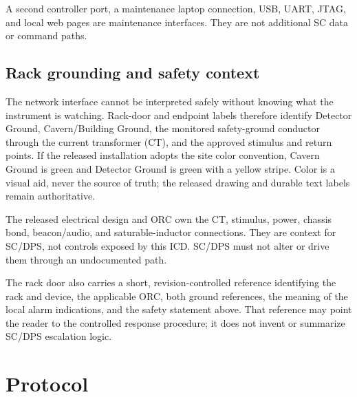 \documentclass{cernatlasnote}
\begin{document}
A second controller port, a maintenance laptop connection, USB, UART, JTAG,
and local web pages are maintenance interfaces. They are not additional SC
data or command paths.

\subsection{Rack grounding and safety context}

The network interface cannot be interpreted safely without knowing what the
instrument is watching. Rack-door and endpoint labels therefore identify
Detector Ground, Cavern/Building Ground, the monitored safety-ground conductor
through the current transformer (CT), and the approved stimulus and return
points. If the released installation adopts the site color convention, Cavern
Ground is green and Detector Ground is green with a yellow stripe. Color is a
visual aid, never the source of truth; the released drawing and durable text
labels remain authoritative.

\begin{center}
\end{center}

The released electrical design and ORC own the CT, stimulus, power, chassis
bond, beacon/audio, and saturable-inductor connections. They are context for
SC/DPS, not controls exposed by this ICD. SC/DPS must not alter or drive them
through an undocumented path.

The rack door also carries a short, revision-controlled reference identifying
the rack and device, the applicable ORC, both ground references, the meaning of
the local alarm indications, and the safety statement above. That reference
may point the reader to the controlled response procedure; it does not invent
or summarize SC/DPS escalation logic.

\section{Protocol}
\end{document}
